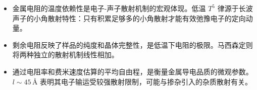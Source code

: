 \begin{insightbox}[物理图像]
\begin{itemize}
    \item 金属电阻的温度依赖性是电子-声子散射机制的宏观体现。低温 $T^5$ 律源于长波声子的小角散射特性：只有积累足够多的小角散射才能有效弛豫电子的定向动量。
    \item 剩余电阻反映了样品的纯度和晶体完整性，是低温下电阻的极限。马西森定则将两种独立的散射机制线性相加。
    \item 通过电阻率和费米速度估算的平均自由程，是衡量金属导电品质的微观参数。$l\sim45\,\text{\AA}$ 表明其电子输运受较强散射限制，可能与掺杂引入的杂质散射有关。
\end{itemize}
\end{insightbox}
